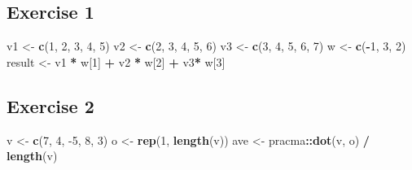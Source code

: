 \documentclass[
]{book}
\newenvironment{Shaded}{\begin{snugshade}}{\end{snugshade}}
\newcommand{\DecValTok}[1]{\textcolor[rgb]{0.00,0.00,0.81}{#1}}
\newcommand{\KeywordTok}[1]{\textcolor[rgb]{0.13,0.29,0.53}{\textbf{#1}}}
\newcommand{\NormalTok}[1]{#1}
\newcommand{\OperatorTok}[1]{\textcolor[rgb]{0.81,0.36,0.00}{\textbf{#1}}}
\newcommand{\StringTok}[1]{\textcolor[rgb]{0.31,0.60,0.02}{#1}}
\begin{document}
\hypertarget{exercise-1}{%
\subsection*{Exercise 1}\label{exercise-1}}

\begin{Shaded}
\begin{Highlighting}[]
\NormalTok{v1 \textless{}{-}}\StringTok{ }\KeywordTok{c}\NormalTok{(}\DecValTok{1}\NormalTok{, }\DecValTok{2}\NormalTok{, }\DecValTok{3}\NormalTok{, }\DecValTok{4}\NormalTok{, }\DecValTok{5}\NormalTok{)}
\NormalTok{v2 \textless{}{-}}\StringTok{ }\KeywordTok{c}\NormalTok{(}\DecValTok{2}\NormalTok{, }\DecValTok{3}\NormalTok{, }\DecValTok{4}\NormalTok{, }\DecValTok{5}\NormalTok{, }\DecValTok{6}\NormalTok{)}
\NormalTok{v3 \textless{}{-}}\StringTok{ }\KeywordTok{c}\NormalTok{(}\DecValTok{3}\NormalTok{, }\DecValTok{4}\NormalTok{, }\DecValTok{5}\NormalTok{, }\DecValTok{6}\NormalTok{, }\DecValTok{7}\NormalTok{)}
\NormalTok{w \textless{}{-}}\StringTok{ }\KeywordTok{c}\NormalTok{(}\OperatorTok{{-}}\DecValTok{1}\NormalTok{, }\DecValTok{3}\NormalTok{, }\DecValTok{2}\NormalTok{)}
\NormalTok{result \textless{}{-}}\StringTok{ }\NormalTok{v1 }\OperatorTok{*}\StringTok{ }\NormalTok{w[}\DecValTok{1}\NormalTok{] }\OperatorTok{+}\StringTok{ }\NormalTok{v2 }\OperatorTok{*}\StringTok{ }\NormalTok{w[}\DecValTok{2}\NormalTok{] }\OperatorTok{+}\StringTok{ }\NormalTok{v3}\OperatorTok{*}\StringTok{ }\NormalTok{w[}\DecValTok{3}\NormalTok{]}
\end{Highlighting}
\end{Shaded}

\hypertarget{exercise-2}{%
\subsection*{Exercise 2}\label{exercise-2}}

\begin{Shaded}
\begin{Highlighting}[]
\NormalTok{v \textless{}{-}}\StringTok{ }\KeywordTok{c}\NormalTok{(}\DecValTok{7}\NormalTok{, }\DecValTok{4}\NormalTok{, }\DecValTok{{-}5}\NormalTok{, }\DecValTok{8}\NormalTok{, }\DecValTok{3}\NormalTok{)}
\NormalTok{o \textless{}{-}}\StringTok{ }\KeywordTok{rep}\NormalTok{(}\DecValTok{1}\NormalTok{, }\KeywordTok{length}\NormalTok{(v))}
\NormalTok{ave \textless{}{-}}\StringTok{ }\NormalTok{pracma}\OperatorTok{::}\KeywordTok{dot}\NormalTok{(v, o) }\OperatorTok{/}\StringTok{ }\KeywordTok{length}\NormalTok{(v)}
\end{Highlighting}
\end{Shaded}
\end{document}
